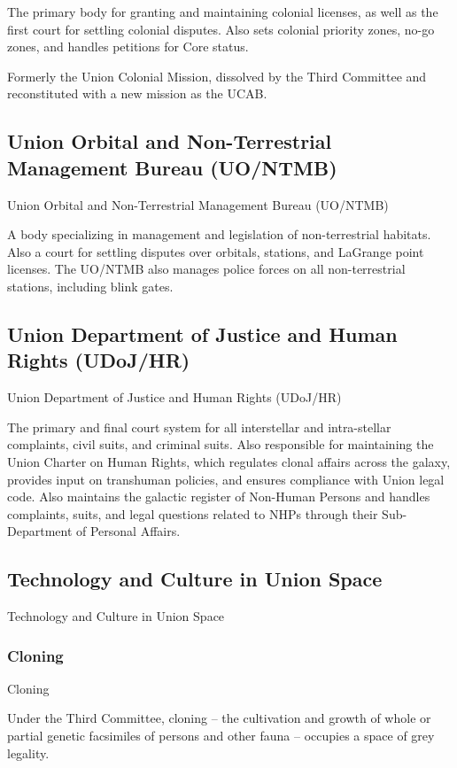 The primary body for granting and maintaining colonial licenses, as well as the first court for  
settling colonial disputes. Also sets colonial priority zones, no-go zones, and handles petitions  
for Core status. 
 

Formerly the Union Colonial Mission, dissolved by the Third Committee and reconstituted with a  
new mission as the UCAB. 
 
\subsection{Union Orbital and Non-Terrestrial Management Bureau (UO/NTMB) }
Union Orbital and Non-Terrestrial Management Bureau (UO/NTMB)  

A body specializing in management and legislation of non-terrestrial habitats. Also a court for  
settling disputes over orbitals, stations, and LaGrange point licenses. The UO/NTMB also  
manages police forces on all non-terrestrial stations, including blink gates. 
 
\subsection{Union Department of Justice and Human Rights (UDoJ/HR)}
Union Department of Justice and Human Rights (UDoJ/HR)  

The primary and final court system for all interstellar and intra-stellar complaints, civil suits, and  
criminal suits. Also responsible for maintaining the Union Charter on Human Rights, which  
regulates clonal affairs across the galaxy, provides input on transhuman policies, and ensures  
compliance with Union legal code. Also maintains the galactic register of Non-Human Persons  
and handles complaints, suits, and legal questions related to NHPs through their Sub- 
Department of Personal Affairs.          

\subsection{Technology and Culture in Union Space}

Technology and Culture in Union Space  
\subsubsection{Cloning}
Cloning   

Under the Third Committee, cloning -- the cultivation and growth of whole or partial genetic  
facsimiles of persons and other fauna -- occupies a space of grey legality. 
 

